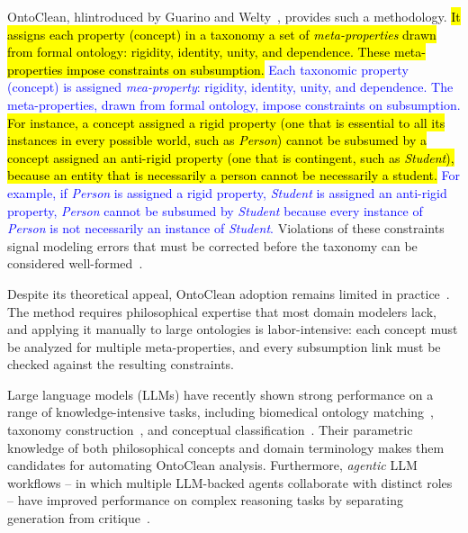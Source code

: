 \documentclass{IOS-Book-Article}
\begin{document}
OntoClean, hl{introduced by Guarino and}
Welty~\cite{guarino2000formal,guarino2002ontoclean,guarino2009ontoclean},
provides such a methodology.  \hl{It assigns each property (concept) in a
  taxonomy a set of \emph{meta-properties} drawn from formal ontology:
  rigidity, identity, unity, and dependence.  These meta-properties
  impose constraints on subsumption.}  \textcolor{blue}{Each taxonomic property (concept) is assigned \emph{mea-property}: rigidity, identity, unity, and dependence. The meta-properties, drawn from formal ontology, impose constraints on subsumption.} \hl{For instance, a concept assigned a rigid property
  (one that is essential to all its instances in every possible world,
  such as \emph{Person}) cannot be subsumed by a concept assigned an anti-rigid property
  (one that is contingent, such as \emph{Student}), because an entity that is necessarily a person cannot be necessarily a student.} \textcolor{blue}{For example, if \emph{Person} is assigned a rigid property, \emph{Student} is assigned an anti-rigid property, \emph{Person} cannot be subsumed by \emph{Student} because every instance of \emph{Person} is not necessarily an instance of \emph{Student}.} Violations of these constraints signal modeling errors that must be corrected before the taxonomy can be considered well-formed~\cite{guarino2000formal}.

Despite its theoretical appeal, OntoClean adoption remains limited in
practice~\cite{guarino2009ontoclean}.  The method requires philosophical expertise that most
domain modelers lack, and applying it manually to large ontologies is
labor-intensive: each concept must be analyzed for multiple
meta-properties, and every subsumption link must be checked against the
resulting constraints.

Large language models (LLMs) have recently shown strong performance on
a range of knowledge-intensive tasks, including biomedical ontology
matching~\cite{he2023llm4om}, taxonomy construction~\cite{babaei2023llms4ol}, and conceptual classification~.  Their
parametric knowledge of both philosophical concepts and domain
terminology makes them candidates for automating OntoClean analysis.
Furthermore, \emph{agentic} LLM workflows -- in which multiple
LLM-backed agents collaborate with distinct roles -- have improved
performance on complex reasoning tasks by separating generation from
critique~\cite{shinn2023reflexion}.
\end{document}
